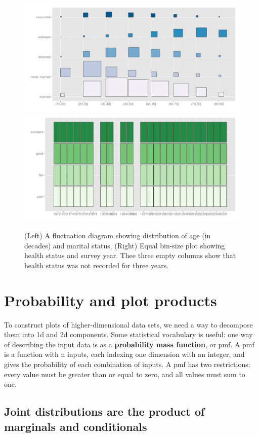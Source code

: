 \documentclass[journal]{vgtc}
\begin{document}
\begin{figure}[htbp]
  \centering
    \includegraphics[width=0.9 \linewidth]{part-fluct}
    \includegraphics[width=0.9 \linewidth]{part-fluct-cond}
  \caption{(Left) A fluctuation diagram showing distribution of age (in decades) and marital status. (Right) Equal bin-size plot showing health status and survey year. Thee three empty columns show that health status was not recorded for three years.}
  \label{fig:fluct}
\end{figure}

\section{Probability and plot products}
\label{sec:combination}

To construct plots of higher-dimensional data sets, we need a way to decompose them into 1d and 2d components. Some statistical vocabulary is useful: one way of describing the input data is as a {\bf probability mass function}, or {\sc pmf}. A {\sc pmf} is a function with n inputs, each indexing one dimension with an integer, and gives the probability of each combination of inputs. A {\sc pmf} has two restrictions: every value must be greater than or equal to zero, and all values must sum to one.  

\subsection{Joint distributions are the product of marginals and conditionals}
\end{document}
